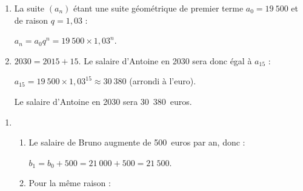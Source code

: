 \begin{corrige}
\begin{enumerate}
          \begin{enumerate}[label=\alph*.]

               \item %
               La suite $(a_n)$ étant une suite géométrique de premier terme $a_0=19\ 500$ et de raison $q=1,03$ :
               \par
               $a_n = a_0q^n=19\ 500 \times 1,03^n$.
               \item %
               ${2030=2015+15}$. Le salaire d'Antoine en 2030 sera donc égal à $a_{15}$ :
               \par
               $a_{15}=19\ 500 \times 1,03^{15}\approx 30\ 380$ (arrondi à l'euro).
               \par
               Le salaire d'Antoine en 2030 sera 30~380~euros.
               \par
          \end{enumerate}
          \par
     \end{enumerate}
     \par
     \par
     \begin{enumerate}
          \par
          \item %
          \par
          \begin{enumerate}[label=\alph*.]
               \par
               \item %
               \par
               Le salaire de Bruno augmente de 500~euros par an, donc :
               \par
               $b_1=b_0+500=21\ 000+500=21\ 500$.
               \par
               \item %
               \par
               Pour la même raison :

\end{enumerate}
\end{enumerate}
\end{corrige}
